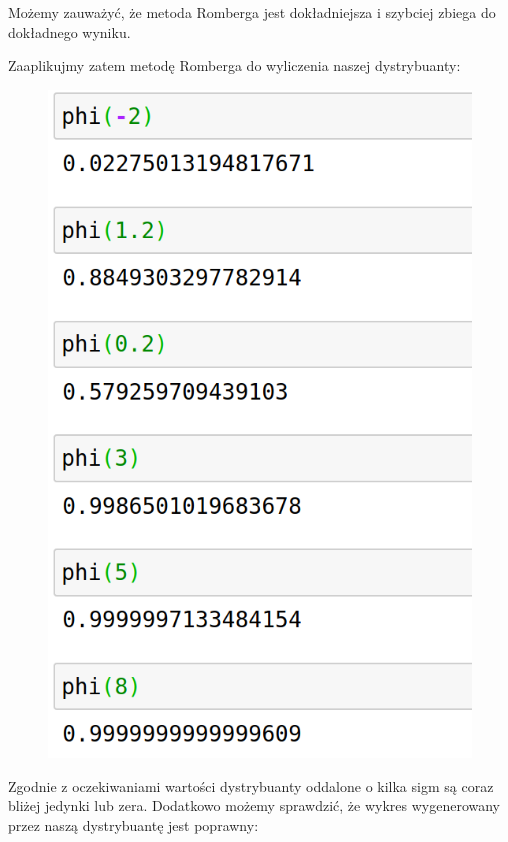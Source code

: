 \documentclass[a4paper]{article}
\begin{document}
Możemy zauważyć, że metoda Romberga jest dokładniejsza i szybciej zbiega do dokładnego wyniku.


\newpage
Zaaplikujmy zatem metodę Romberga do wyliczenia naszej dystrybuanty:

\begin{figure}[htbp]{}
\centerline{\includegraphics[scale=.30]{outputs_Phi.png}}
\label{fig:outputs_Phi}
\end{figure}

Zgodnie z oczekiwaniami wartości dystrybuanty oddalone o kilka sigm są coraz bliżej jedynki lub zera. Dodatkowo możemy sprawdzić, że wykres wygenerowany przez naszą dystrybuantę jest poprawny:
\end{document}
